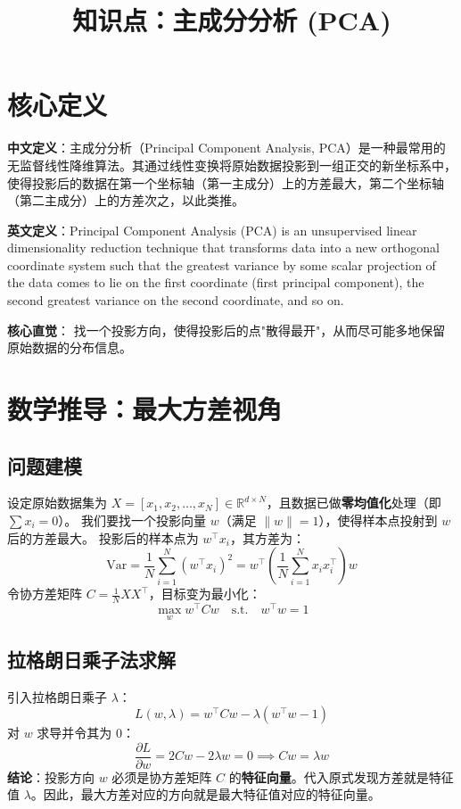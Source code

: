 \documentclass[12pt, a4paper]{article}
\title{知识点：主成分分析 (PCA)}
\author{}
\date{}
\begin{document}
\maketitle

\section{核心定义}
\textbf{中文定义}：主成分分析（Principal Component Analysis, PCA）是一种最常用的无监督线性降维算法。其通过线性变换将原始数据投影到一组正交的新坐标系中，使得投影后的数据在第一个坐标轴（第一主成分）上的方差最大，第二个坐标轴（第二主成分）上的方差次之，以此类推。

\textbf{英文定义}：Principal Component Analysis (PCA) is an unsupervised linear dimensionality reduction technique that transforms data into a new orthogonal coordinate system such that the greatest variance by some scalar projection of the data comes to lie on the first coordinate (first principal component), the second greatest variance on the second coordinate, and so on.

\textbf{核心直觉}：
找一个投影方向，使得投影后的点"散得最开"，从而尽可能多地保留原始数据的分布信息。

\section{数学推导：最大方差视角}

\subsection{问题建模}
设定原始数据集为 $X = [x_1, x_2, \dots, x_N] \in \mathbb{R}^{d \times N}$，且数据已做\textbf{零均值化}处理（即 $\sum x_i = 0$）。
我们要找一个投影向量 $w$（满足 $\|w\|=1$），使得样本点投射到 $w$ 后的方差最大。
投影后的样本点为 $w^\top x_i$，其方差为：
$$ \text{Var} = \frac{1}{N} \sum_{i=1}^N (w^\top x_i)^2 = w^\top \left( \frac{1}{N} \sum_{i=1}^N x_i x_i^\top \right) w $$
令协方差矩阵 $C = \frac{1}{N} XX^\top$，目标变为最小化：
$$ \max_{w} w^\top C w \quad \text{s.t.} \quad w^\top w = 1 $$

\subsection{拉格朗日乘子法求解}
引入拉格朗日乘子 $\lambda$：
$$ L(w, \lambda) = w^\top C w - \lambda (w^\top w - 1) $$
对 $w$ 求导并令其为 0：
$$ \frac{\partial L}{\partial w} = 2Cw - 2\lambda w = 0 \implies Cw = \lambda w $$
\textbf{结论}：投影方向 $w$ 必须是协方差矩阵 $C$ 的\textbf{特征向量}。代入原式发现方差就是特征值 $\lambda$。因此，最大方差对应的方向就是最大特征值对应的特征向量。
\end{document}

